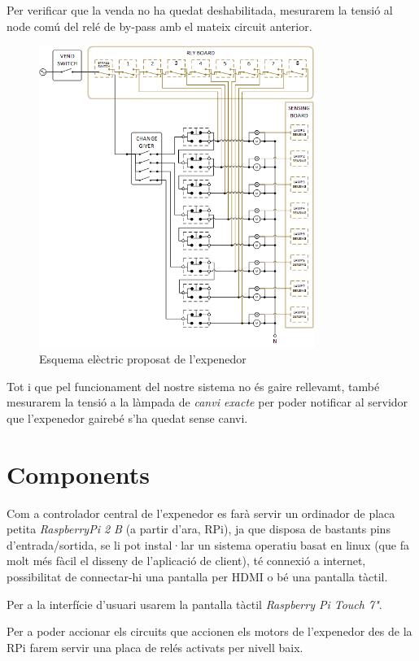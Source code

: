 Per verificar que la venda no ha quedat deshabilitada, mesurarem la tensió al node comú del relé de by-pass amb el mateix circuit anterior.

\begin{figure}[H]
\center
\includegraphics[width=0.8\textwidth]{images/vender_electrical_complete}
\caption{Esquema elèctric proposat de l'expenedor}
\label{fig:vender_electrical_complete}
\end{figure}

Tot i que pel funcionament del nostre sistema no és gaire rellevamt, també mesurarem la tensió a la làmpada de \textit{canvi exacte} per poder notificar al servidor que l'expenedor gairebé s'ha quedat sense canvi.

\section{Components}
Com a controlador central de l'expenedor es farà servir un ordinador de placa petita \textit{RaspberryPi 2 B} (a partir d'ara, RPi), ja que disposa de bastants pins d'entrada/sortida, se li pot instal·lar un sistema operatiu basat en linux (que fa molt més fàcil el disseny de l'aplicació de client), té connexió a internet, possibilitat de connectar-hi una pantalla per HDMI o bé una pantalla tàctil.

Per a la interfície d'usuari usarem la pantalla tàctil \textit{Raspberry Pi Touch 7"}.

Per a poder accionar els circuits que accionen els motors de l'expenedor des de la RPi farem servir una placa de relés activats per nivell baix.



